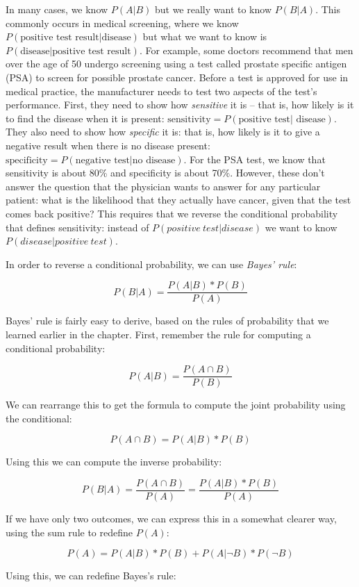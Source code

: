 \documentclass[]{book}
\theoremstyle{definition}
\theoremstyle{definition}
\theoremstyle{definition}
\theoremstyle{remark}
\begin{document}
In many cases, we know \(P(A|B)\) but we really want to know \(P(B|A)\).
This commonly occurs in medical screening, where we know
\(P(\text{positive test result|disease})\) but what we want to know is
\(P(\text{disease|positive test result})\). For example, some doctors
recommend that men over the age of 50 undergo screening using a test
called prostate specific antigen (PSA) to screen for possible prostate
cancer. Before a test is approved for use in medical practice, the
manufacturer needs to test two aspects of the test's performance. First,
they need to show how \emph{sensitive} it is -- that is, how likely is
it to find the disease when it is present:
\(\text{sensitivity} = P(\text{positive test| disease})\). They also
need to show how \emph{specific} it is: that is, how likely is it to
give a negative result when there is no disease present:
\(\text{specificity} = P(\text{negative test|no disease})\). For the PSA
test, we know that sensitivity is about 80\% and specificity is about
70\%. However, these don't answer the question that the physician wants
to answer for any particular patient: what is the likelihood that they
actually have cancer, given that the test comes back positive? This
requires that we reverse the conditional probability that defines
sensitivity: instead of \(P(positive\ test| disease)\) we want to know
\(P(disease|positive\ test)\).

In order to reverse a conditional probability, we can use \emph{Bayes'
rule}:

\[
P(B|A) = \frac{P(A|B)*P(B)}{P(A)}
\]

Bayes' rule is fairly easy to derive, based on the rules of probability
that we learned earlier in the chapter. First, remember the rule for
computing a conditional probability:

\[
P(A|B) = \frac{P(A \cap B)}{P(B)}
\]

We can rearrange this to get the formula to compute the joint
probability using the conditional:

\[
P(A \cap B) = P(A|B) * P(B)
\]

Using this we can compute the inverse probability:

\[
P(B|A) = \frac{P(A \cap B)}{P(A)} =   \frac{P(A|B)*P(B)}{P(A)}
\]

If we have only two outcomes, we can express this in a somewhat clearer
way, using the sum rule to redefine \(P(A)\):

\[
P(A) = P(A|B)*P(B) + P(A|\neg B)*P(\neg B)
\]

Using this, we can redefine Bayes's rule:
\end{document}
